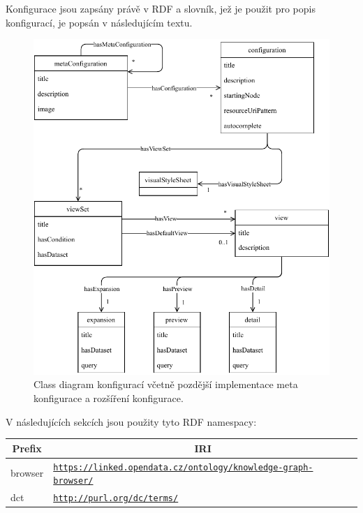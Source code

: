 \bigskip

Konfigurace jsou zapsány právě v RDF a slovník, jež je použit pro popis konfigurací, je popsán v následujícím textu.

\begin{figure}
    \centering
    \includegraphics{media/configuration-class-diagram.pdf}
    \caption{Class diagram konfigurací včetně pozdější implementace meta konfigurace a rozšíření konfigurace.}
    \label{fig:configuration-class-diagram}
\end{figure}

\bigskip

V následujících sekcích jsou použity tyto RDF namespacy:
\begin{table}[h] \centering
\begin{tabular}{lp{10cm}}
\toprule
\multicolumn{1}{c}{Prefix} & \multicolumn{1}{c}{IRI}                                      \\
\midrule
browser                    & \texttt{\url{https://linked.opendata.cz/ontology/knowledge-graph-browser/}} \\
dct                        & \texttt{\url{http://purl.org/dc/terms/}}
\end{tabular}
\end{table}

